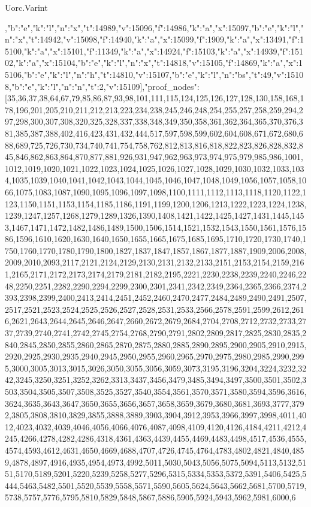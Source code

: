 \begin{lexlean}{Uorc.Varint}
\begin{coremodule}
,{"b":"e","k":"l","n":"x","t":14989,"v":15096},{"f":14986,"k":"a","x":15097},{"b":"e","k":"l","n":"x","t":14942,"v":15098},{"f":14940,"k":"a","x":15099},{"f":1909,"k":"a","x":13491},{"f":15100,"k":"a","x":15101},{"f":11349,"k":"a","x":14924},{"f":15103,"k":"a","x":14939},{"f":15102,"k":"a","x":15104},{"b":"e","k":"l","n":"x","t":14818,"v":15105},{"f":14869,"k":"a","x":15106},{"b":"e","k":"l","n":"h","t":14810,"v":15107},{"b":"e","k":"l","n":"bs","t":49,"v":15108},{"b":"e","k":"l","n":"n","t":2,"v":15109}],"proof_nodes":[35,36,37,38,64,67,79,85,86,87,93,98,101,111,115,124,125,126,127,128,130,158,168,178,196,201,205,210,211,212,213,223,234,238,245,246,248,254,255,257,258,259,294,297,298,300,307,308,320,325,328,337,338,348,349,350,358,361,362,364,365,370,376,381,385,387,388,402,416,423,431,432,444,517,597,598,599,602,604,608,671,672,680,688,689,725,726,730,734,740,741,754,758,762,812,813,816,818,822,823,826,828,832,845,846,862,863,864,870,877,881,926,931,947,962,963,973,974,975,979,985,986,1001,1012,1019,1020,1021,1022,1023,1024,1025,1026,1027,1028,1029,1030,1032,1033,1034,1035,1039,1040,1041,1042,1043,1044,1045,1046,1047,1048,1049,1056,1057,1058,1066,1075,1083,1087,1090,1095,1096,1097,1098,1100,1111,1112,1113,1118,1120,1122,1123,1150,1151,1153,1154,1185,1186,1191,1199,1200,1206,1213,1222,1223,1224,1238,1239,1247,1257,1268,1279,1289,1326,1390,1408,1421,1422,1425,1427,1431,1445,1453,1467,1471,1472,1482,1486,1489,1500,1506,1514,1521,1532,1543,1550,1561,1576,1586,1596,1610,1620,1630,1640,1650,1655,1665,1675,1685,1695,1710,1720,1730,1740,1750,1760,1770,1780,1790,1800,1827,1837,1847,1857,1867,1877,1887,1909,2006,2008,2009,2010,2093,2117,2121,2124,2129,2130,2131,2132,2133,2151,2153,2154,2159,2161,2165,2171,2172,2173,2174,2179,2181,2182,2195,2221,2230,2238,2239,2240,2246,2248,2250,2251,2282,2290,2294,2299,2300,2301,2341,2342,2349,2364,2365,2366,2374,2393,2398,2399,2400,2413,2414,2451,2452,2460,2470,2477,2484,2489,2490,2491,2507,2517,2521,2523,2524,2525,2526,2527,2528,2531,2533,2566,2578,2591,2599,2612,2616,2621,2643,2644,2645,2646,2647,2660,2672,2679,2684,2704,2708,2712,2732,2733,2737,2739,2740,2741,2742,2745,2754,2768,2790,2791,2802,2809,2817,2825,2830,2835,2840,2845,2850,2855,2860,2865,2870,2875,2880,2885,2890,2895,2900,2905,2910,2915,2920,2925,2930,2935,2940,2945,2950,2955,2960,2965,2970,2975,2980,2985,2990,2995,3000,3005,3013,3015,3026,3050,3055,3056,3059,3073,3195,3196,3204,3224,3232,3242,3245,3250,3251,3252,3262,3313,3437,3456,3479,3485,3494,3497,3500,3501,3502,3503,3504,3505,3507,3508,3525,3527,3540,3554,3561,3570,3571,3580,3594,3596,3616,3624,3635,3643,3647,3650,3655,3656,3657,3658,3659,3679,3680,3681,3693,3777,3792,3805,3808,3810,3829,3855,3888,3889,3903,3904,3912,3953,3966,3997,3998,4011,4012,4023,4032,4039,4046,4056,4066,4076,4087,4098,4109,4120,4126,4184,4211,4212,4245,4266,4278,4282,4286,4318,4361,4363,4439,4455,4469,4483,4498,4517,4536,4555,4574,4593,4612,4631,4650,4669,4688,4707,4726,4745,4764,4783,4802,4821,4840,4859,4878,4897,4916,4935,4954,4973,4992,5011,5030,5043,5056,5075,5094,5113,5132,5151,5170,5189,5201,5220,5239,5258,5277,5296,5315,5334,5353,5372,5391,5406,5425,5444,5463,5482,5501,5520,5539,5558,5571,5590,5605,5624,5643,5662,5681,5700,5719,5738,5757,5776,5795,5810,5829,5848,5867,5886,5905,5924,5943,5962,5981,6000,6
\end{coremodule}
\end{lexlean}
